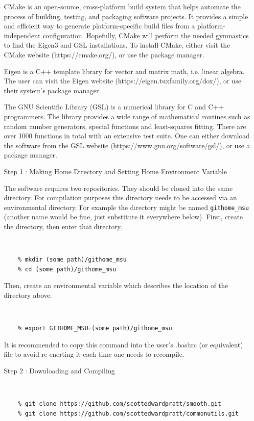 \documentclass[12pt]{article}
\numberwithin{equation}{section}
\numberwithin{figure}{section}
\begin{document}
CMake is an open-source, cross-platform build system that helps automate the process of building, testing, and packaging software projects. It provides a simple and efficient way to generate platform-specific build files from a platform-independent configuration. Hopefully, CMake will perform the needed gymnastics to find the Eigen3 and GSL installations. To install CMake, either visit the CMake website (https://cmake.org/), or use the package manager.

Eigen is a C++ template library for vector and matrix math, i.e. linear algebra. The user can visit the Eigen website (https://eigen.tuxfamily.org/dox/), or use their system's package manager.

The GNU Scientific Library (GSL) is a numerical library for C and C++ programmers. The library provides a wide range of mathematical routines such as random number generators, special functions and least-squares fitting. There are over 1000 functions in total with an extensive test suite. One can either download the software from the GSL website (https://www.gnu.org/software/gsl/), or use a package manager.



\begin{description}
\item[Step 1 : Making Home Directory and Setting Home Environment Variable]
\end{description}

The software requires two repositories. They should be cloned into the same directory. For compilation purposes this directory needs to be accessed via an environmental directory.  For example the directory might be named {\tt githome\_msu} (another name would be fine, just substitute it everywhere below). First, create the directory, then enter that directory.
{\tt 
\begin{verbatim}
    % mkdir (some path)/githome_msu
    % cd (some path)/githome_msu
\end{verbatim}
}
Then, create an environmental variable which describes the location of the directory above. 

{\tt 
\begin{verbatim}
    % export GITHOME_MSU=(some path)/githome_msu
\end{verbatim}
}
It is recommended to copy this command into the user's .bashrc (or equivalent) file to avoid re-enerting it each time one needs to recompile.

\begin{description}
\item[Step 2 : Downloading and Compiling]\label{sec:Downloading and Compiling}
\end{description}
{\tt 
\begin{verbatim}
    % git clone https://github.com/scottedwardpratt/smooth.git
    % git clone https://github.com/scottedwardpratt/commonutils.git
\end{verbatim}
}
\end{document}
